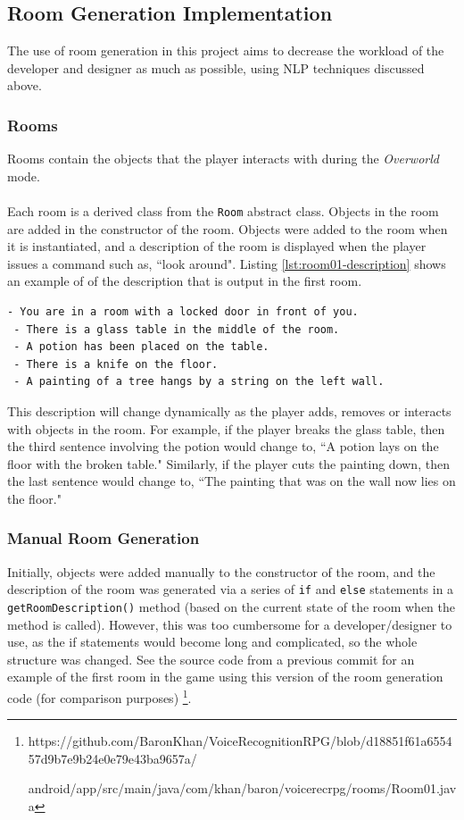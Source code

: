 \documentclass[11pt]{article}
\begin{document}
\label{section:obj-properties-wordnet}

\subsection{Room Generation Implementation}
\label{section:room-generation}

The use of room generation in this project aims to decrease the workload of the developer and designer as much as possible, using NLP techniques discussed above.

\subsubsection{Rooms}
Rooms contain the objects that the player interacts with during the \textit{Overworld} mode.
\\
\\
Each room is a derived class from the \texttt{Room} abstract class. Objects in the room are added in the constructor of the room. Objects were added to the room when it is instantiated, and a description of the room is displayed when the player issues a command such as, ``look around". Listing \ref{lst:room01-description} shows an example of of the description that is output in the first room.

\begin{lstlisting}[label=lst:room01-description]
 - You are in a room with a locked door in front of you.
 - There is a glass table in the middle of the room.
 - A potion has been placed on the table.
 - There is a knife on the floor.
 - A painting of a tree hangs by a string on the left wall.
\end{lstlisting}

This description will change dynamically as the player adds, removes or interacts with objects in the room. For example, if the player breaks the glass table, then the third sentence involving the potion would change to, ``A potion lays on the floor with the broken table." Similarly, if the player cuts the painting down, then the last sentence would change to, ``The painting that was on the wall now lies on the floor."

\subsubsection{Manual Room Generation}

Initially, objects were added manually to the constructor of the room, and the description of the room was generated via a series of \texttt{if} and \texttt{else} statements in a \texttt{getRoomDescription()} method (based on the current state of the room when the method is called). However, this was too cumbersome for a developer/designer to use, as the if statements would become long and complicated, so the whole structure was changed. See the source code from a previous commit for an example of the first room in the game using this version of the room generation code (for comparison purposes) \footnote{https://github.com/BaronKhan/VoiceRecognitionRPG/blob/d18851f61a655457d9b7e9b24e0e79e43ba9657a/

android/app/src/main/java/com/khan/baron/voicerecrpg/rooms/Room01.java}.
\end{document}
